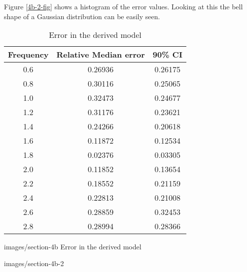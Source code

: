 Figure \ref{4b-2-fig} shows a histogram of the error values.  Looking at this
the bell shape of a Gaussian distribution can be easily seen.

\begin{table}
    \centering
    \begin{tabular}{c|c|c}
        Frequency & Relative Median error & 90\% CI \\
        \hline
        0.6 & 0.26936 & 0.26175 \\
        0.8 & 0.30116 & 0.25065 \\
        1.0 & 0.32473 & 0.24677 \\
        1.2 & 0.31176 & 0.23621 \\
        1.4 & 0.24266 & 0.20618 \\
        1.6 & 0.11872 & 0.12534 \\
        1.8 & 0.02376 & 0.03305 \\
        2.0 & 0.11852 & 0.13654 \\
        2.2 & 0.18552 & 0.21159 \\
        2.4 & 0.22813 & 0.21008 \\
        2.6 & 0.28859 & 0.32453 \\
        2.8 & 0.28994 & 0.28366 
    \end{tabular}
    \caption{Error in the derived model\label{4b}}
\end{table}

              {images/section-4b}
              {Error in the derived model\label{4b-fig}}

              {images/section-4b-2}
              {\label{4b-2-fig}}
